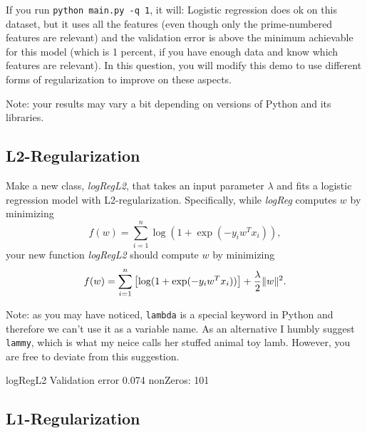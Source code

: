 \documentclass{article}
\begin{document}
If you run  \verb|python main.py -q 1|, it will:
Logistic regression does ok on this dataset, 
but it uses all the features (even though only the prime-numbered features are relevant) 
and the validation error is above the minimum achievable for this model 
(which is 1 percent, if you have enough data and know which features are relevant). 
In this question, you will modify this demo to use different forms of regularization
 to improve on these aspects.

Note: your results may vary a bit depending on versions of Python and its libraries.


\subsection{L2-Regularization}

Make a new class, \emph{logRegL2}, that takes an input parameter $\lambda$ and fits a logistic regression model with L2-regularization. Specifically, while \emph{logReg} computes $w$ by minimizing
\[
f(w) = \sum_{i=1}^n \log(1+\exp(-y_iw^Tx_i)),
\]
your new function \emph{logRegL2} should compute $w$ by minimizing
\[
f(w) = \sum_{i=1}^n \left[\log(1+\exp(-y_iw^Tx_i))\right] + \frac{\lambda}{2}\|w\|^2.
\]

Note: as you may have noticed, \texttt{lambda} is a special keyword in Python and therefore we can't use it as a variable name. 
As an alternative I humbly suggest \texttt{lammy}, which is what my neice calls her stuffed animal toy lamb.
However, you are free to deviate from this suggestion. 

logRegL2 Validation error 0.074 nonZeros: 101

\subsection{L1-Regularization}
\end{document}
